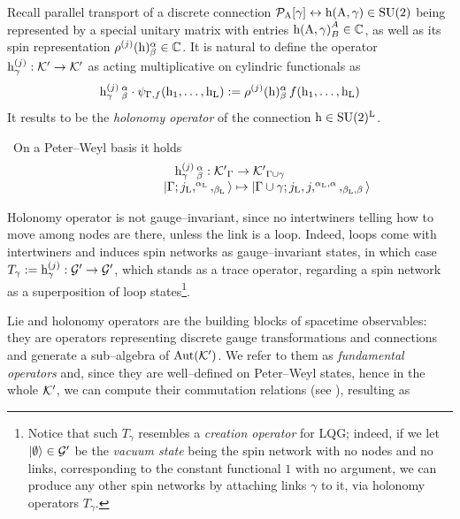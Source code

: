 \begin{defi}
Recall parallel transport of a discrete connection $\mathcal{P}_{\text{\normalfont A}}[\gamma]\leftrightarrow\text{\normalfont h}(\text{\normalfont A},\gamma)\in\text{\normalfont SU}(2)$ being represented by a special unitary matrix with entries ${\text{\normalfont h}(\text{\normalfont A},\gamma)}^A_B\in\mathbb{C}$, as well as its spin representation $\rho^{(j)}(\text{\normalfont h})^\alpha_\beta\in\mathbb{C}$. It is natural to define the operator $\text{\normalfont h}^{(j)}_\gamma:{\mathcal{K}'}\to{\mathcal{K}'}$ as acting multiplicative on cylindric functionals as
$$\text{\normalfont h}^{(j)}_\gamma\,^\alpha_\beta\cdot\psi_{\Gamma,f}(\text{\normalfont h}_1,\hdots,\text{\normalfont h}_{\text{\normalfont L}}):=\rho^{(j)}
(\text{\normalfont h})^\alpha_\beta \,f(\text{\normalfont h}_1,\hdots,\text{\normalfont h}_{\text{\normalfont L}})$$
It results to be the \emph{holonomy operator} of the connection $\text{\normalfont h}\in\text{\normalfont SU}(2)^{\text{\normalfont L}}$.
\end{defi}
\,\newline
On a Peter--Weyl basis it holds
$$\begin{matrix}
    \text{\normalfont h}_\gamma^{(j)}\,^\alpha_\beta:{\mathcal{K}'}_\Gamma\to{\mathcal{K}'}_{\Gamma\cup\gamma}\\
    \qquad\qquad\qquad\left| \Gamma;j_{\text{\normalfont L}},^{\alpha_{\text{\normalfont L}}},_{\beta_{\text{\normalfont L}}} \right >\mapsto\left|\Gamma\cup\gamma;j_{\text{\normalfont L}},j,^{\alpha_{\text{\normalfont L}},\alpha},_{\beta_{\text{\normalfont L}},\beta}\right\rangle
\end{matrix}$$

\begin{remark}
    Holonomy operator is not gauge--invariant, since no intertwiners telling how to move among nodes are there, unless the link is a loop. Indeed, loops come with intertwiners and induces spin networks as gauge--invariant states, in which case $T_\gamma:=\text{\normalfont h}_\gamma^{(j)}:\mathcal{G}'\to\mathcal{G}'$, which stands as a trace operator, regarding a spin network as a superposition of loop states\footnote{Notice that such $T_\gamma$ resembles a \emph{creation operator} for LQG; indeed, if we let $\left| \emptyset \right >\in\mathcal{G}'$ be the \emph{vacuum state} being the spin network with no nodes and no links, corresponding to the constant functional $1$ with no argument, we can produce any other spin networks by attaching links $\gamma$ to it, via holonomy operators $T_\gamma$.}.
\end{remark}

{Lie and holonomy operators are the building blocks of spacetime observables: they are operators representing discrete gauge transformations and connections and generate a sub--algebra of $\text{\normalfont Aut}(\mathcal{K}')$.} We refer to them as \emph{fundamental operators} and, since they are well--defined on Peter--Weyl states, hence in the whole $\mathcal{K}'$, we can compute their commutation relations (see \cite{LN8}), resulting as

